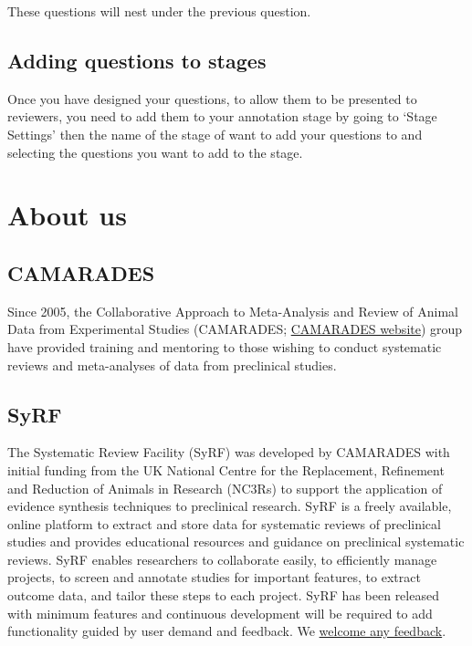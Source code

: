 \documentclass[
]{book}
\begin{document}
These questions will nest under the previous question.

\hypertarget{adding-questions-to-stages}{%
\section{Adding questions to stages}\label{adding-questions-to-stages}}

Once you have designed your questions, to allow them to be presented to reviewers, you need to add them to your annotation stage by going to `Stage Settings' then the name of the stage of want to add your questions to and selecting the questions you want to add to the stage.

\hypertarget{about}{%
\chapter{About us}\label{about}}

\hypertarget{camarades}{%
\section{CAMARADES}\label{camarades}}

Since 2005, the Collaborative Approach to Meta-Analysis and Review of Animal Data from Experimental Studies (CAMARADES; \href{https://www.ed.ac.uk/clinical-brain-sciences/research/camarades}{CAMARADES website}) group have provided training and mentoring to those wishing to conduct systematic reviews and meta-analyses of data from preclinical studies.

\hypertarget{syrf}{%
\section{SyRF}\label{syrf}}

The Systematic Review Facility (SyRF) was developed by CAMARADES with initial funding from the UK National Centre for the Replacement, Refinement and Reduction of Animals in Research (NC3Rs) to support the application of evidence synthesis techniques to preclinical research. SyRF is a freely available, online platform to extract and store data for systematic reviews of preclinical studies and provides educational resources and guidance on preclinical systematic reviews. SyRF enables researchers to collaborate easily, to efficiently manage projects, to screen and annotate studies for important features, to extract outcome data, and tailor these steps to each project. SyRF has been released with minimum features and continuous development will be required to add functionality guided by user demand and feedback. We \href{mailto:syrf.info@ed.ac.uk}{welcome any feedback}.
\end{document}
